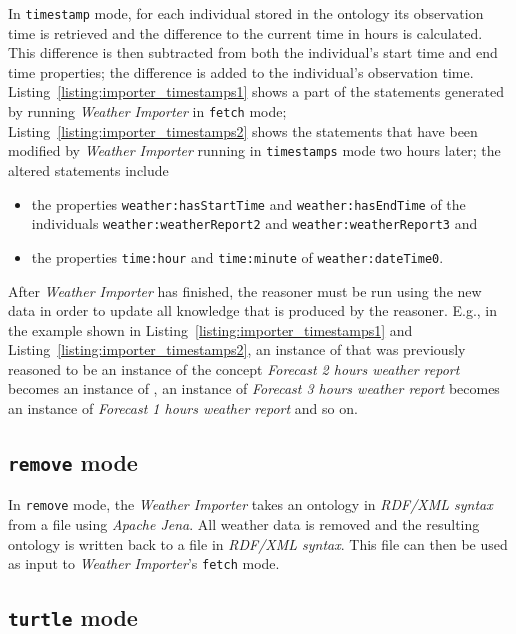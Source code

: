 In \texttt{timestamp} mode, for each  individual stored in the ontology its observation time is retrieved and the difference to the current time in hours is calculated. This difference is then subtracted from both the individual's start time and end time properties; the difference is added to the individual's observation time. Listing~\ref{listing:importer_timestamps1} shows a part of the statements generated by running \emph{Weather Importer} in \texttt{fetch} mode; Listing~\ref{listing:importer_timestamps2} shows the statements that have been modified by \emph{Weather Importer} running in \texttt{timestamps} mode two hours later; the altered statements include

\begin{itemize}
  \item the properties \texttt{weather:hasStartTime} and \texttt{weather:hasEndTime} of the individuals \texttt{weather:weatherReport2} and \texttt{weather:weatherReport3} and
  \item the properties \texttt{time:hour} and \texttt{time:minute} of \texttt{weather:dateTime0}.
\end{itemize}

After \emph{Weather Importer} has finished, the  reasoner must be run using the new data in order to update all knowledge that is produced by the reasoner. E.g., in the example shown in Listing~\ref{listing:importer_timestamps1} and Listing~\ref{listing:importer_timestamps2}, an instance of  that was previously reasoned to be an instance of the concept \emph{Forecast 2 hours weather report} becomes an instance of , an instance of \emph{Forecast 3 hours weather report} becomes an instance of \emph{Forecast 1 hours weather report} and so on.

\subsection{\texttt{remove} mode}

In \texttt{remove} mode, the \emph{Weather Importer} takes an ontology in \emph{RDF/XML syntax} from a file using \emph{Apache Jena}. All weather data is removed and the resulting ontology is written back to a file in \emph{RDF/XML syntax}. This file can then be used as input to \emph{Weather Importer}'s \texttt{fetch} mode.

\subsection{\texttt{turtle} mode}
\label{subsec:importer_turtle}

